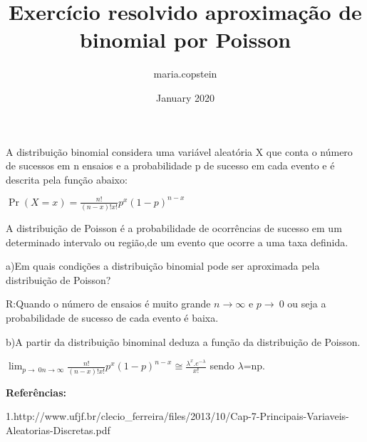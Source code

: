 \documentclass{article}
\title{Exercício resolvido aproximação de binomial por Poisson}
\author{maria.copstein }
\date{January 2020}
\begin{document}
\maketitle
\hfill 

A distribuição binomial considera uma variável aleatória X que conta o número de sucessos em n ensaios e  a probabilidade p de sucesso em cada evento e é descrita pela função abaixo:
\begin{center}
    $\Pr(X=x)=\frac{n!}{(n-x)!x!}p^x(1-p) ^ {n-x}$
    
\end{center}
A distribuição de Poisson é a probabilidade de ocorrências de sucesso em um determinado intervalo ou região,de um evento que ocorre a uma taxa definida.

\hfill 

a)Em quais condições a distribuição binomial pode ser aproximada pela distribuição de Poisson?

\hfill 

R:Quando o número de ensaios é muito grande $n\rightarrow\infty$ e $p\rightarrow\ 0$ ou seja a probabilidade de sucesso de cada evento é baixa.

\hfill

b)A partir da distribuição binominal deduza a função da distribuição de Poisson.

\begin{center}
   $\displaystyle\lim_{p\rightarrow\ 0  n\rightarrow\infty} \frac{n!}{(n-x)!x!}p^x(1-p) ^ {n-x}\cong \frac{\lambda^{x}.e^{-\lambda}}{x!}$
   sendo ${\lambda}$=np.
   
   
\hfill 
   
\textbf{Referências:} \
   
\hfill

1.http://www.ufjf.br/clecio\_ferreira/files/2013/10/Cap-7-Principais-Variaveis-Aleatorias-Discretas.pdf
    
\end{center}
\end{document}
